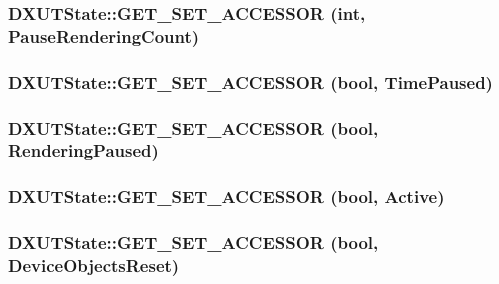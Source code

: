 \label{class_d_x_u_t_state_a13cadfb38e001bbb14292eb6aae1a03c}
\hypertarget{class_d_x_u_t_state_a458e562a6427b58eb4d41dc932888b07}{
\subsubsection[{GET\_\-SET\_\-ACCESSOR}]{\setlength{\rightskip}{0pt plus 5cm}DXUTState::GET\_\-SET\_\-ACCESSOR ({\bf int}, \/  PauseRenderingCount)}}
\label{class_d_x_u_t_state_a458e562a6427b58eb4d41dc932888b07}
\hypertarget{class_d_x_u_t_state_a2b593e9cf8d3cbb8158b45ff051a33e7}{
\subsubsection[{GET\_\-SET\_\-ACCESSOR}]{\setlength{\rightskip}{0pt plus 5cm}DXUTState::GET\_\-SET\_\-ACCESSOR (bool, \/  TimePaused)}}
\label{class_d_x_u_t_state_a2b593e9cf8d3cbb8158b45ff051a33e7}
\hypertarget{class_d_x_u_t_state_a1201e10a8729dec22b252ff1682a46c0}{
\subsubsection[{GET\_\-SET\_\-ACCESSOR}]{\setlength{\rightskip}{0pt plus 5cm}DXUTState::GET\_\-SET\_\-ACCESSOR (bool, \/  RenderingPaused)}}
\label{class_d_x_u_t_state_a1201e10a8729dec22b252ff1682a46c0}
\hypertarget{class_d_x_u_t_state_a86fa93ddd4667d88896569250f131444}{
\subsubsection[{GET\_\-SET\_\-ACCESSOR}]{\setlength{\rightskip}{0pt plus 5cm}DXUTState::GET\_\-SET\_\-ACCESSOR (bool, \/  Active)}}
\label{class_d_x_u_t_state_a86fa93ddd4667d88896569250f131444}
\hypertarget{class_d_x_u_t_state_a4c31ee243c293f73584d675041eaea2b}{
\subsubsection[{GET\_\-SET\_\-ACCESSOR}]{\setlength{\rightskip}{0pt plus 5cm}DXUTState::GET\_\-SET\_\-ACCESSOR (bool, \/  DeviceObjectsReset)}}

